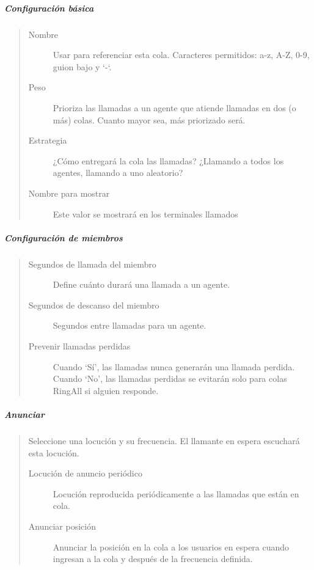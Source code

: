 \documentclass[letterpaper,10pt,spanish]{sphinxmanual}
\begin{document}
\subparagraph{Configuración básica}
\label{administration_portal/client/vpbx/routing_endpoints/queues:basic-configuration}\begin{quote}
\begin{description}
\item[{Nombre}] \leavevmode
Usar para referenciar esta cola. Caracteres permitidos: a-z, A-Z, 0-9, guion bajo y `-`.

\item[{Peso}] \leavevmode
Prioriza las llamadas a un agente que atiende llamadas en dos (o más) colas. Cuanto mayor sea, más priorizado será.

\item[{Estrategia}] \leavevmode
¿Cómo entregará la cola las llamadas? ¿Llamando a todos los agentes, llamando a uno aleatorio?

\item[{Nombre para mostrar}] \leavevmode
Este valor se mostrará en los terminales llamados

\end{description}
\end{quote}


\subparagraph{Configuración de miembros}
\label{administration_portal/client/vpbx/routing_endpoints/queues:members-configuration}\begin{quote}
\begin{description}
\item[{Segundos de llamada del miembro}] \leavevmode
Define cuánto durará una llamada a un agente.

\item[{Segundos de descanso del miembro}] \leavevmode
Segundos entre llamadas para un agente.

\item[{Prevenir llamadas perdidas}] \leavevmode
Cuando `Sí', las llamadas nunca generarán una llamada perdida. Cuando `No', las llamadas perdidas se evitarán solo para colas RingAll si alguien responde.

\end{description}
\end{quote}


\subparagraph{Anunciar}
\label{administration_portal/client/vpbx/routing_endpoints/queues:announce}\begin{quote}

Seleccione una locución y su frecuencia. El llamante en espera escuchará esta locución.
\begin{description}
\item[{Locución de anuncio periódico}] \leavevmode
Locución reproducida periódicamente a las llamadas que están en cola.

\item[{Anunciar posición}] \leavevmode
Anunciar la posición en la cola a los usuarios en espera cuando ingresan a la cola y después de la frecuencia definida.

\end{description}
\end{quote}
\end{document}
